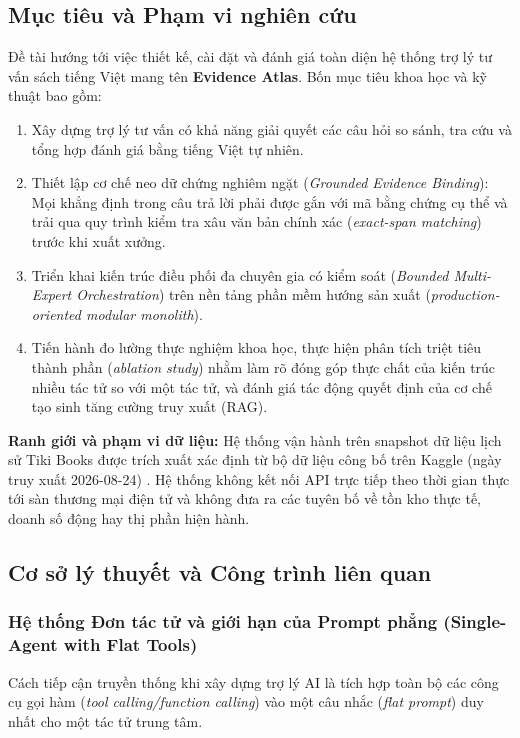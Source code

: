 \subsection{Mục tiêu và Phạm vi nghiên cứu}
Đề tài hướng tới việc thiết kế, cài đặt và đánh giá toàn diện hệ thống trợ lý tư vấn sách tiếng Việt mang tên \textbf{Evidence Atlas}. Bốn mục tiêu khoa học và kỹ thuật bao gồm:
\begin{enumerate}
    \item Xây dựng trợ lý tư vấn có khả năng giải quyết các câu hỏi so sánh, tra cứu và tổng hợp đánh giá bằng tiếng Việt tự nhiên.
    \item Thiết lập cơ chế neo dữ chứng nghiêm ngặt (\textit{Grounded Evidence Binding}): Mọi khẳng định trong câu trả lời phải được gắn với mã bằng chứng cụ thể và trải qua quy trình kiểm tra xâu văn bản chính xác (\textit{exact-span matching}) trước khi xuất xưởng.
    \item Triển khai kiến trúc điều phối đa chuyên gia có kiểm soát (\textit{Bounded Multi-Expert Orchestration}) trên nền tảng phần mềm hướng sản xuất (\textit{production-oriented modular monolith}).
    \item Tiến hành đo lường thực nghiệm khoa học, thực hiện phân tích triệt tiêu thành phần (\textit{ablation study}) nhằm làm rõ đóng góp thực chất của kiến trúc nhiều tác tử so với một tác tử, và đánh giá tác động quyết định của cơ chế tạo sinh tăng cường truy xuất (RAG).
\end{enumerate}

\textbf{Ranh giới và phạm vi dữ liệu:} Hệ thống vận hành trên snapshot dữ liệu lịch sử Tiki Books được trích xuất xác định từ bộ dữ liệu công bố trên Kaggle (ngày truy xuất 2026-08-24) . Hệ thống không kết nối API trực tiếp theo thời gian thực tới sàn thương mại điện tử và không đưa ra các tuyên bố về tồn kho thực tế, doanh số động hay thị phần hiện hành.

\subsection{Cơ sở lý thuyết và Công trình liên quan}

\subsubsection{Hệ thống Đơn tác tử và giới hạn của Prompt phẳng (Single-Agent with Flat Tools)}
Cách tiếp cận truyền thống khi xây dựng trợ lý AI là tích hợp toàn bộ các công cụ gọi hàm (\textit{tool calling/function calling}) vào một câu nhắc (\textit{flat prompt}) duy nhất cho một tác tử trung tâm. 

